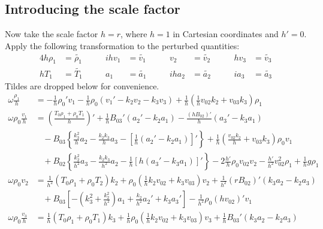 \documentclass[11pt, fleqn]{article}
\begin{document}
\subsection{Introducing the scale factor}
Now take the scale factor $h = r$, where $h = 1$ in Cartesian coordinates and $h' = 0$. Apply the following transformation to the perturbed quantities:
\begin{alignat*}{4}
	h\rho_1 &= \widetilde{\rho_1}		\qquad&		ihv_1 &= \widetilde{v_1}		\qquad&		v_2 	&= \widetilde{v_2}		\qquad&			hv_3 &= \widetilde{v_3}			\\
	hT_1		&= \widetilde{T_1}			&					a_1   &= \widetilde{a_1}					&		iha_2	&= \widetilde{a_2}					&			ia_3 &= \widetilde{a_3}
\end{alignat*}
Tildes are dropped below for convenience.
\begin{equation}
	\begin{aligned}
		\omega \frac{\rho_1}{h}			&= -\frac{1}{h}\rho_0'v_1 - \frac{1}{h}\rho_0\left(v_1' - k_2v_2 - k_3v_3\right) + \frac{1}{h}\left(\frac{1}{h}v_{02}k_2 + v_{03}k_3\right)\rho_1																																		\\[8pt]
		\omega \rho_0 \frac{v_1}{h} &= \left(\frac{T_0\rho_1 + \rho_0 T_1}{h}\right)' + \frac{1}{h}B_{03}'\left(a_2' - k_2a_1\right) - \frac{(hB_{02})'}{h}\left(a_3' - k_3a_1\right)																																		\\
																&~~~~ - B_{03}\left\{\frac{k_3^2}{h}a_2 - \frac{k_2k_3}{h}a_3 - \left[\frac{1}{h}\left(a_2' - k_2a_1\right)\right]'\right\} + \frac{1}{h}\left(\frac{v_{02}k_2}{h} + v_{03}k_3\right)\rho_0v_1											\\
																&~~~~ + B_{02}\left\{\frac{k_2^2}{h^2}a_3 - \frac{k_2k_3}{h^2}a_2 - \frac{1}{h}\left[h\left(a_3' - k_3a_1\right)\right]'\right\} - 2\frac{h'}{h}\rho_0v_{02}v_2 - \frac{h'}{h^2}v_{02}^2\rho_1 + \frac{1}{h}g\rho_1	\\[8pt]
		\omega \rho_0 v_2						&= \frac{1}{h^2}(T_0\rho_1 + \rho_0T_2)k_2 + \rho_0\left(\frac{1}{h}k_2v_{02} + k_3v_{03}\right)v_2 + \frac{1}{h^2}(rB_{02})'\left(k_3a_2 - k_2a_3\right)																														\\
																&~~~~ + B_{03}\left[-\left(k_3^2 + \frac{k_2^2}{h^2}\right)a_1 + \frac{k_2}{h^2}a_2' + k_3a_3'\right] - \frac{1}{h^2}\rho_0(hv_{02})'v_1																																						\\[8pt]
		\omega \rho_0 \frac{v_3}{h} &= \frac{1}{h}(T_0 \rho_1 + \rho_0 T_1)k_3 + \frac{1}{h}\rho_0\left(\frac{1}{h}k_2v_{02} + k_3v_{03}\right)v_3 + \frac{1}{h}B_{03}'\left(k_3a_2 - k_2a_3\right) 																										\\

\end{aligned}
\end{equation}
\end{document}
